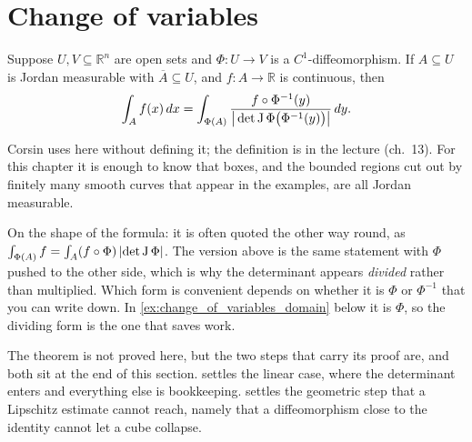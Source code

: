 
\section{Change of variables}
\label{sec:change_of_variables}

\begin{theorem}
\label{thm:change_of_variables}
Suppose $U,V \subseteq \mathbb{R}^n$ are open sets and $\Phi : U \to V$ is a
$C^1$-diffeomorphism. If $A \subseteq U$ is Jordan measurable with $\overline{A} \subseteq U$,
and $f : A \to \mathbb{R}$ is continuous, then
\[\int_A f(x)\,dx
  = \int_{\Phi(A)} \frac{f\circ\Phi^{-1}(y)}{\big|\det \operatorname{J}\Phi\big(\Phi^{-1}(y)\big)\big|}\,dy.\]
\end{theorem}

\begin{ainote}
Corsin uses   here without defining it;
the definition is in the lecture (ch.~13). For this chapter it is enough to know that boxes,
and the bounded regions cut out by finitely many smooth curves that appear in the examples, are
all Jordan measurable.

On the shape of the formula: it is often quoted the other way round, as
$\int_{\Phi(A)} f = \int_A (f\circ\Phi)\,\lvert\det\operatorname{J}\Phi\rvert$. The version above is the same
statement with $\Phi$ pushed to the other side, which is why the determinant appears
\emph{divided} rather than multiplied. Which form is convenient depends on whether it is $\Phi$
or $\Phi^{-1}$ that you can write down. In \cref{ex:change_of_variables_domain} below it is
$\Phi$, so the dividing form is the one that saves work.

The theorem is not proved here, but the two steps that carry its proof are, and both sit at the
end of this section.  settles the linear case,
where the determinant enters and everything else is bookkeeping.
 settles the geometric step that a Lipschitz estimate
cannot reach, namely that a diffeomorphism close to the identity cannot let a cube collapse.
\end{ainote}

